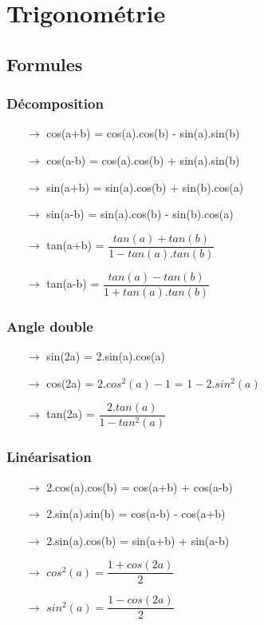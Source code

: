 
\chapter{Trigonométrie}
\section{Formules}
\subsection{Décomposition}
\begin{itemize}
 \item[{$\rightarrow$}] cos(a+b) = cos(a).cos(b) - sin(a).sin(b)\\
 \item[{$\rightarrow$}] cos(a-b) = cos(a).cos(b) + sin(a).sin(b)\\
 \item[{$\rightarrow$}] sin(a+b) = sin(a).cos(b) + sin(b).cos(a)\\
 \item[{$\rightarrow$}] sin(a-b) = sin(a).cos(b) - sin(b).cos(a)\\
 \item[{$\rightarrow$}] tan(a+b) = $\dfrac{tan(a) + tan(b)}{1 - tan(a).tan(b)}$\\
 \item[{$\rightarrow$}] tan(a-b) = $\dfrac{tan(a) - tan(b)}{1 + tan(a).tan(b)}$
\end{itemize}
\subsection{Angle double}
\begin{itemize}
\item[{$\rightarrow$}] sin(2a) = 2.sin(a).cos(a)\\
\item[{$\rightarrow$}] cos(2a) = $2.cos^2(a)-1$ = $1 - 2.sin^2(a)$\\
\item[{$\rightarrow$}] tan(2a) = $\dfrac{2.tan(a)}{1-tan^2(a)}$
\end{itemize}
\subsection{Linéarisation}
\begin{itemize}
 \item[{$\rightarrow$}] 2.cos(a).cos(b) = cos(a+b) + cos(a-b)\\
\item[{$\rightarrow$}] 2.sin(a).sin(b) = cos(a-b) - cos(a+b)\\
\item[{$\rightarrow$}] 2.sin(a).cos(b) = sin(a+b) + sin(a-b)\\
\item[{$\rightarrow$}] $cos^2(a) = \dfrac{1+cos(2a)}{2}$\\
\item[{$\rightarrow$}] $sin^2(a) = \dfrac{1-cos(2a)}{2}$
\end{itemize}
